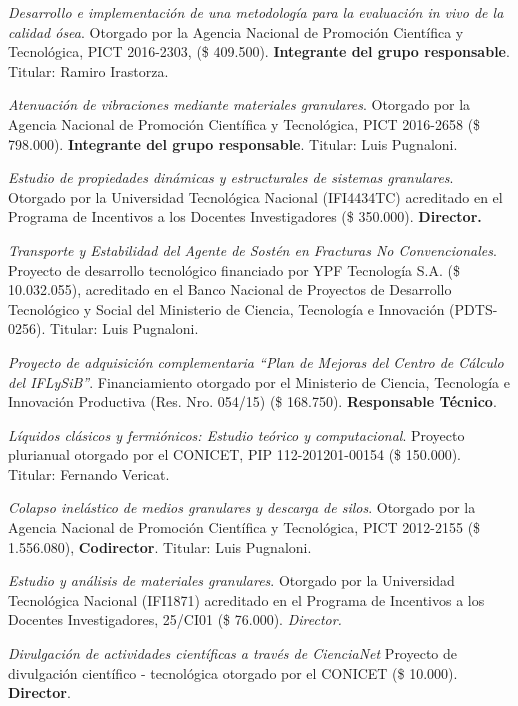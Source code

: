  \textit{Desarrollo e implementación de una metodología para la evaluación \textit{in vivo} de la calidad ósea}. Otorgado por la Agencia Nacional de Promoción Científica y Tecnológica, PICT 2016-2303, (\$ 409.500). \textbf{Integrante del grupo responsable}. Titular: Ramiro Irastorza.

 \textit{Atenuación de vibraciones mediante materiales granulares}. Otorgado por la Agencia Nacional de Promoción Científica y Tecnológica, PICT 2016-2658 (\$ 798.000). \textbf{Integrante del grupo responsable}. Titular: Luis Pugnaloni.

 \textit{Estudio de propiedades dinámicas y estructurales de sistemas granulares}. Otorgado por la Universidad Tecnológica Nacional (IFI4434TC) acreditado en el Programa de Incentivos a los Docentes Investigadores (\$ 350.000). \textbf{Director.}

 \textit{Transporte y Estabilidad del Agente de Sostén en Fracturas No Convencionales}. Proyecto de desarrollo tecnológico financiado por YPF Tecnología S.A. (\$ 10.032.055), acreditado en el Banco Nacional de Proyectos de Desarrollo Tecnológico y Social del Ministerio de Ciencia, Tecnología e Innovación (PDTS-0256). Titular: Luis Pugnaloni.

 \textit{Proyecto de adquisición complementaria ``Plan de Mejoras del Centro de Cálculo del IFLySiB''}. Financiamiento otorgado por el Ministerio de Ciencia, Tecnología e Innovación Productiva (Res. Nro. 054/15) (\$ 168.750). \textbf{Responsable Técnico}.

  \textit{Líquidos clásicos y fermiónicos: Estudio teórico y computacional}. Proyecto plurianual otorgado por el CONICET, PIP 112-201201-00154 (\$ 150.000). Titular: Fernando Vericat.

 \textit{Colapso inelástico de medios granulares y descarga de silos}. Otorgado por la Agencia Nacional de Promoción Científica y Tecnológica, PICT 2012-2155 (\$ 1.556.080), \textbf{Codirector}. Titular: Luis Pugnaloni.

 \textit{Estudio y análisis de materiales granulares}. Otorgado por la Universidad Tecnológica Nacional (IFI1871) acreditado en el Programa de Incentivos a los Docentes Investigadores, 25/CI01 (\$ 76.000). \textit{Director.}

 \textit{Divulgación de actividades científicas a través de CienciaNet} Proyecto de divulgación científico - tecnológica otorgado por el CONICET (\$ 10.000). \textbf{Director}.


